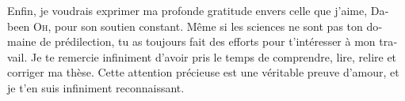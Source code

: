\begin{otherlanguage}{french}

Enfin, je voudrais exprimer ma profonde gratitude envers celle que j'aime, Dabeen \textsc{Oh}, pour son soutien constant. Même si les sciences ne sont pas ton domaine de prédilection, tu as toujours fait des efforts pour t'intéresser à mon travail. Je te remercie infiniment d'avoir pris le temps de comprendre, lire, relire et corriger ma thèse. Cette attention précieuse est une véritable preuve d'amour, et je t'en suis infiniment reconnaissant.

\endgroup
\clearpage

%
%
%
%
%
%
%

\end{otherlanguage}

